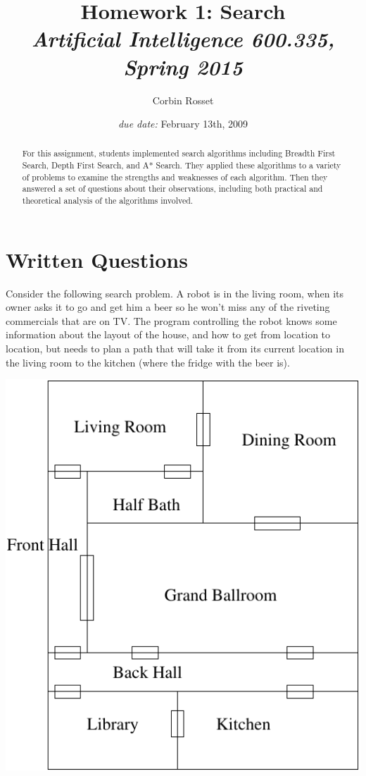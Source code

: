 \documentclass[12pt]{article}
\title{Homework 1: Search\\ \normalsize\emph{Artificial Intelligence 600.335, Spring 2015}}
\date{\emph{due date:} February 13th, 2009}
\author{Corbin Rosset}
\newcommand{\n}{\vspace{5mm}}
\begin{document}
\maketitle

\begin{abstract}
  For this assignment, students implemented search algorithms including
  Breadth First Search, Depth First Search, and A* Search.  They applied
  these algorithms to a variety of problems to examine the strengths and
  weaknesses of each algorithm.  Then they answered a set of questions about
  their observations, including both practical and theoretical analysis of the
  algorithms involved.
\end{abstract}

\section{Written Questions}





Consider the following search problem.  A robot is in the living room,
when its owner asks it to go and get him a beer so he won't miss any of the
riveting commercials that are on TV.  The program controlling the robot knows
some information about the layout of the house, and how to get from location to
location, but needs to plan a path that will take it from its current location
in the living room to the kitchen (where the fridge with the beer is).

\includegraphics[scale=0.85]{./images/house.pdf}
\n
\end{document}
